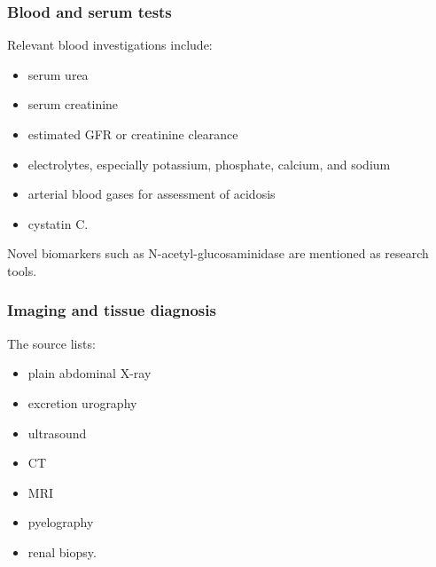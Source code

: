 \documentclass[11pt,a4paper]{article}
\begin{document}
\subsubsection{Blood and serum tests}

Relevant blood investigations include:
\begin{itemize}
  \item serum urea
  \item serum creatinine
  \item estimated GFR or creatinine clearance
  \item electrolytes, especially potassium, phosphate, calcium, and sodium
  \item arterial blood gases for assessment of acidosis
  \item cystatin C.
\end{itemize}

Novel biomarkers such as N-acetyl-glucosaminidase are mentioned as research tools.

\subsubsection{Imaging and tissue diagnosis}

The source lists:
\begin{itemize}
  \item plain abdominal X-ray
  \item excretion urography
  \item ultrasound
  \item CT
  \item MRI
  \item pyelography
  \item renal biopsy.
\end{itemize}
\end{document}
